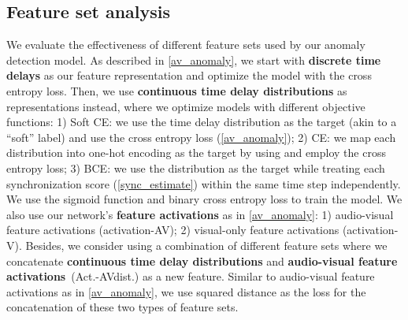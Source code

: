 \documentclass[10pt,twocolumn,letterpaper]{article}
\begin{document}
\subsection{Feature set analysis}
\label{feature_analysis}
We evaluate the effectiveness of different feature sets used by our anomaly detection model. As described in \cref{av_anomaly}, we start with {\bf discrete time delays} as our feature representation and optimize the model with the cross entropy loss. Then, we use {\bf continuous time delay distributions} as representations instead, where we optimize models with different objective functions: 1) Soft CE: we use the time delay distribution as the target (akin to a ``soft'' label) and use the cross entropy loss (\cref{av_anomaly}); 2) CE: we map each distribution into one-hot encoding as the target by using  and employ the cross entropy loss; 3) BCE: we use the distribution as the target while treating each synchronization score  (\cref{sync_estimate}) within the same time step independently. We use the sigmoid function and binary cross entropy loss to train the model. We also use our network's {\bf feature activations} as in \cref{av_anomaly}: 1) audio-visual feature activations (activation-AV); 2) visual-only feature activations (activation-V). Besides, we consider using a combination of different feature sets where we concatenate {\bf continuous time delay distributions} and {\bf audio-visual feature activations}~(Act.-AVdist.) as a new feature. Similar to audio-visual feature activations as in \cref{av_anomaly}, we use squared distance as the loss for the concatenation of these two types of feature sets. 
\end{document}

